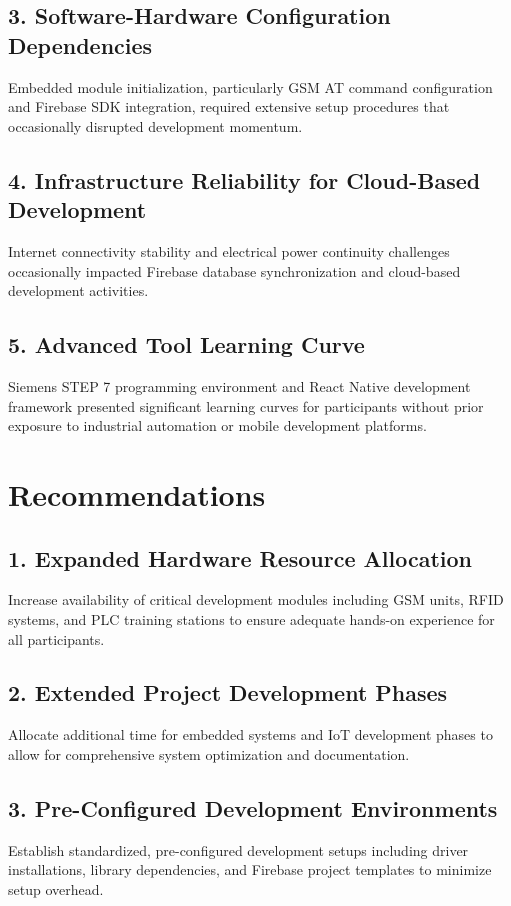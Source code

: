 \documentclass[12pt,a4paper]{report}
\begin{document}
\subsection*{3. Software-Hardware Configuration Dependencies}
Embedded module initialization, particularly GSM AT command configuration and Firebase SDK integration, required extensive setup procedures that occasionally disrupted development momentum.

\subsection*{4. Infrastructure Reliability for Cloud-Based Development}
Internet connectivity stability and electrical power continuity challenges occasionally impacted Firebase database synchronization and cloud-based development activities.

\subsection*{5. Advanced Tool Learning Curve}
Siemens STEP 7 programming environment and React Native development framework presented significant learning curves for participants without prior exposure to industrial automation or mobile development platforms.

\section{Recommendations}

\subsection*{1. Expanded Hardware Resource Allocation}
Increase availability of critical development modules including GSM units, RFID systems, and PLC training stations to ensure adequate hands-on experience for all participants.

\subsection*{2. Extended Project Development Phases}
Allocate additional time for embedded systems and IoT development phases to allow for comprehensive system optimization and documentation.

\subsection*{3. Pre-Configured Development Environments}
Establish standardized, pre-configured development setups including driver installations, library dependencies, and Firebase project templates to minimize setup overhead.
\end{document}
